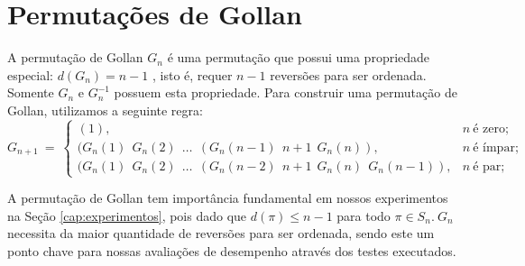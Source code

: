 \section{Permutações de Gollan}
A permutação de Gollan $G_n$ é uma permutação que possui uma propriedade especial: $d(G_n) = n - 1$ \cite{kececioglu1995exact}, isto é, requer $n-1$ reversões para ser ordenada. Somente $G_n$ e $G_n^{-1}$ possuem esta propriedade. Para construir uma permutação de Gollan, utilizamos a seguinte regra: 
\[G_{n+1} \ = \ \left \{
\begin{array}{cl}
  (1), & n \ \mbox{é zero}; \\
   (G_n(1) \ \ G_n(2) \ \ \ldots \ \ (G_n(n-1) \ \ n+1 \ \ G_n(n)),& n \ \mbox{é  ímpar}; \\
    ( G_n(1) \ \ G_n(2) \ \ \ldots \ \ (G_n(n-2) \ \ n+1 \ \ G_n(n) \ \ G_n(n-1)),& n \ \mbox{é par};
\end{array}
\right.\]

A permutação de Gollan tem importância fundamental em nossos experimentos na Seção \ref{cap:experimentos}, pois dado que $d(\pi) \leq n-1$ para todo $\pi \in S_n.\ G_n$ necessita da maior quantidade de reversões para ser ordenada, sendo este um ponto chave para nossas avaliações de desempenho através dos testes executados.





